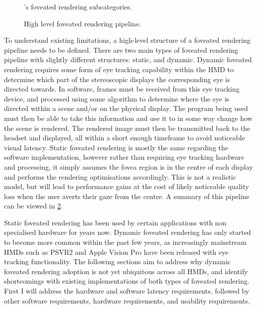 \documentclass[a4paper,11pt]{article}
\begin{document}
\begin{figure}
  \begin{center}
    
    \caption{\citeauthor{mohanto2022integrative}'s\cite{mohanto2022integrative} foveated rendering subcategories.}
    \label{fig:types}
  \end{center}
\end{figure}

\begin{figure}
  \begin{center}
    
    \caption{High level foveated rendering pipeline.}
    \label{fig:pipeline}
  \end{center}
\end{figure}

To understand existing limitations, a high-level structure of a foveated rendering pipeline needs to be defined. There are two main types of foveated rendering pipeline with slightly different structures: static, and dynamic. Dynamic foveated rendering requires some form of eye tracking capability within the HMD to determine which part of the stereoscopic displays the corresponding eye is directed towards. In software, frames must be received from this eye tracking device, and processed using some algorithm to determine where the eye is directed within a scene and/or on the physical display. The program being used must then be able to take this information and use it to in some way change how the scene is rendered. The rendered image must then be transmitted back to the headset and displayed, all within a short enough timeframe to avoid noticeable visual latency. Static foveated rendering is mostly the same regarding the software implementation, however rather than requiring eye tracking hardware and processing, it simply assumes the fovea region is in the centre of each display and performs the rendering optimisations accordingly. This is not a realistic model, but will lead to performance gains at the cost of likely noticeable quality loss when the user averts their gaze from the centre. A summary of this pipeline can be viewed in \cref{fig:pipeline}.

Static foveated rendering has been used by certain applications with non specialised hardware for years now. Dynamic foveated rendering has only started to become more common within the past few years, as increasingly mainstream HMDs such as PSVR2\cite{vr2_fove} and Apple Vision Pro\cite{vision_pro_announce} have been released with eye tracking functionality. The following sections aim to address why dynamic foveated rendering adoption is not yet ubiquitous across all HMDs, and identify shortcomings with existing implementations of both types of foveated rendering. First I will address the hardware and software latency requirements, followed by other software requirements, hardware requirements, and usability requirements.
\end{document}
